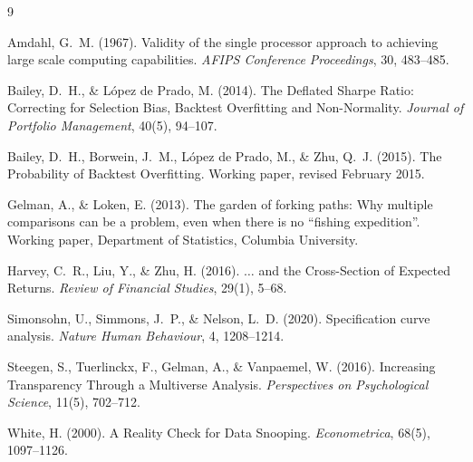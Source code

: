 \documentclass[11pt,a4paper]{article}
\begin{document}
\begin{thebibliography}{9}\small

 Amdahl, G.~M. (1967). Validity of the single processor
approach to achieving large scale computing capabilities.
\emph{AFIPS Conference Proceedings}, 30, 483--485.

 Bailey, D.~H., \& López de Prado, M. (2014). The Deflated
Sharpe Ratio: Correcting for Selection Bias, Backtest Overfitting and
Non-Normality. \emph{Journal of Portfolio Management}, 40(5), 94--107.

 Bailey, D.~H., Borwein, J.~M., López de Prado, M., \&
Zhu, Q.~J. (2015). The Probability of Backtest Overfitting. Working paper,
revised February 2015.

 Gelman, A., \& Loken, E. (2013). The garden of forking
paths: Why multiple comparisons can be a problem, even when there is no
``fishing expedition''. Working paper, Department of Statistics, Columbia
University.

 Harvey, C.~R., Liu, Y., \& Zhu, H. (2016). $\ldots$ and the
Cross-Section of Expected Returns. \emph{Review of Financial Studies}, 29(1),
5--68.

 Simonsohn, U., Simmons, J.~P., \& Nelson, L.~D. (2020).
Specification curve analysis. \emph{Nature Human Behaviour}, 4, 1208--1214.

 Steegen, S., Tuerlinckx, F., Gelman, A., \& Vanpaemel, W.
(2016). Increasing Transparency Through a Multiverse Analysis.
\emph{Perspectives on Psychological Science}, 11(5), 702--712.

 White, H. (2000). A Reality Check for Data Snooping.
\emph{Econometrica}, 68(5), 1097--1126.

\end{thebibliography}
\end{document}
